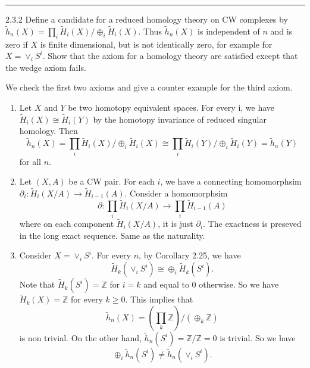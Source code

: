 \documentclass[a4paper, 12pt]{article}
\begin{document}
\noindent\rule{7in}{2.8pt}
\begin{problem}{2.3.2}
Define a candidate for a reduced homology theory on CW complexes by \(\tilde{h}_n(X)=\prod_i \tilde{H}_i(X)/\oplus_i \tilde{H}_i(X)\). Thus \(\tilde{h}_n(X)\) is independent of \(n\) and is zero if \(X\) is finite 
dimensional, but is not identically zero, for example for \(X=\vee_iS^i\). Show that the axiom for a homology theory are satisfied except that the wedge axiom fails.
\end{problem}
\begin{solution}
We check the first two axioms and give a counter example for the third axiom.
\begin{enumerate}[(1)]
\item Let \(X\) and \(Y\) be two homotopy equivalent spaces. For every i, we have \(\tilde{H}_i(X)\cong \tilde{H}_i(Y)\) by the homotopy invariance of reduced singular homology. Then 
\[\tilde{h}_n(X)=\prod_i \tilde{H}_i(X)/\oplus_i \tilde{H}_i(X)\cong \prod_i \tilde{H}_i(Y)/\oplus_i \tilde{H}_i(Y)=\tilde{h}_n(Y)\]
for all \(n\).
\item Let \((X,A)\) be a CW pair. For each \(i\), we have a connecting homomorphsim \(\partial_i:\tilde{H}_i(X/A)\rightarrow \tilde{H}_{i-1}(A)\). Consider a homomorphsim 
\[\partial:\prod_i \tilde{H}_i(X/A)\rightarrow \prod_i \tilde{H}_{i-1}(A)\]
where on each component \(\tilde{H}_i(X/A)\), it is just \(\partial_i\). The exactness is preseved in the long exact sequence. Same as the naturality.
\item Consider \(X=\vee_i S^i\). For every \(n\), by Corollary 2.25, we have 
\[\tilde{H}_k(\vee_i S^i)\cong \oplus_i \tilde{H}_k(S^i).\]
Note that \(\tilde{H}_k(S^i)=\mathbb{Z}\) for \(i=k\) and equal to \(0\) otherwise. So we have \(\tilde{H}_k(X)=\mathbb{Z}\) for every \(k\geq 0\). This implies that 
\[\tilde{h}_n(X)=(\prod_k \mathbb{Z})/(\oplus_k \mathbb{Z})\]
is non trivial. On the other hand, \(\tilde{h}_n(S^i)=\mathbb{Z}/\mathbb{Z}=0\) is trivial. So we have 
\[\oplus_i \tilde{h}_n(S^i)\neq \tilde{h}_n(\vee_i S^i).\]
\end{enumerate}
\end{solution}
\end{document}
